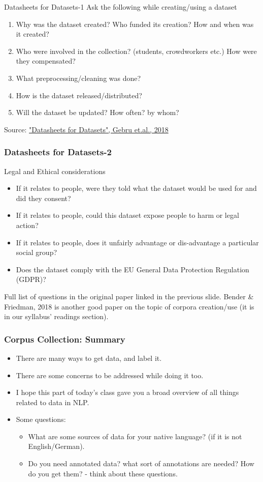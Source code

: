 \documentclass{beamer}
\begin{document}
\begin{frame}{Datasheets for Datasets-1}
Ask the following while creating/using a dataset
\begin{enumerate}
    \item Why was the dataset created? Who funded its creation? How and when was it created?
    \item Who were involved in the collection? (students, crowdworkers etc.) How were they compensated?
    \item What preprocessing/cleaning was done?
    \item How is the dataset released/distributed? 
    \item Will the dataset be updated? How often? by whom?
\end{enumerate}
Source: \href{http://www.fatml.org/media/documents/datasheets_for_datasets.pdf}{"Datasheets for Datasets", Gebru et.al., 2018}
\end{frame}

\begin{frame}
\frametitle{Datasheets for Datasets-2}
Legal and Ethical considerations
\begin{itemize}
\item  If it relates to people, were they told what the dataset would be used for and did they consent?
\item If it relates to people, could this dataset expose people to harm or legal action?
\item If it relates to people, does it unfairly advantage or dis-advantage a particular social group?
\item Does the dataset comply with the EU General Data Protection Regulation (GDPR)?
\end{itemize}
\footnotesize
Full list of questions in the original paper linked in the previous slide. Bender \& Friedman, 2018 is another good paper on the topic of corpora creation/use (it is in our syllabus' readings section). 
\end{frame}

\begin{frame}
\frametitle{Corpus Collection: Summary}
\begin{itemize}
\item There are many ways to get data, and label it.
\item There are some concerns to be addressed while doing it too. 
\item I hope this part of today's class gave you a broad overview of all things related to data in NLP. \pause
\item Some questions:
\begin{itemize}
\item What are some sources of data for your native language? (if it is not English/German). 
\item Do you need annotated data? what sort of annotations are needed? How do you get them? - think about these questions. 
\end{itemize}
\end{itemize}
\end{frame}
\end{document}
